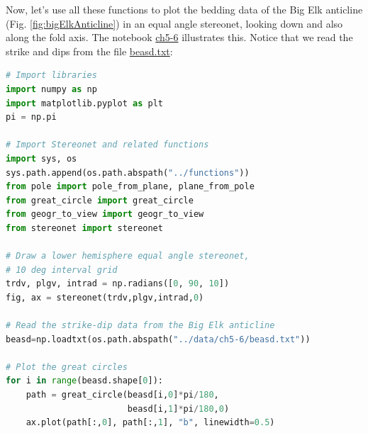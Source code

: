 \documentclass[a4paper , 12pt]{book}
\begin{document}
Now, let's use all these functions to plot the bedding data of the Big Elk anticline (Fig. \ref{fig:bigElkAnticline}) in an equal angle stereonet, looking down and also along the fold axis. The notebook \href{https://github.com/nfcd/compGeo/blob/master/source/notebooks/ch5-6.ipynb}{ch5-6} illustrates this. Notice that we read the strike and dips from the file \href{https://github.com/nfcd/compGeo/blob/master/source/data/ch5-6/beasd.txt}{beasd.txt}:

\begin{center}
\begin{lstlisting}[language=Python, frame=single]
# Import libraries
import numpy as np
import matplotlib.pyplot as plt
pi = np.pi

# Import Stereonet and related functions
import sys, os
sys.path.append(os.path.abspath("../functions"))
from pole import pole_from_plane, plane_from_pole
from great_circle import great_circle
from geogr_to_view import geogr_to_view
from stereonet import stereonet

# Draw a lower hemisphere equal angle stereonet, 
# 10 deg interval grid
trdv, plgv, intrad = np.radians([0, 90, 10]) 
fig, ax = stereonet(trdv,plgv,intrad,0)

# Read the strike-dip data from the Big Elk anticline
beasd=np.loadtxt(os.path.abspath("../data/ch5-6/beasd.txt"))

# Plot the great circles
for i in range(beasd.shape[0]):
    path = great_circle(beasd[i,0]*pi/180,
                        beasd[i,1]*pi/180,0)
    ax.plot(path[:,0], path[:,1], "b", linewidth=0.5)
\end{lstlisting}
\end{center}
\end{document}
